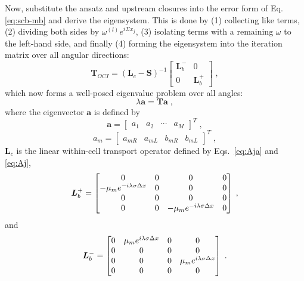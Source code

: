 Now, substitute the ansatz and upstream closures into the error form of Eq. \eqref{eq:scb-mb} and derive the eigensystem.
This is done by (1) collecting like terms, (2) dividing both sides by $\omega^{(l)} e^{i\Sigma x_j}$, (3) isolating terms with a remaining $\omega$ to the left-hand side, and finally (4) forming the eigensystem into the iteration matrix over all angular directions:
\begin{equation}
    \bm{T}_{OCI} = \left( 
    \bm{L}_c
    - \bm{S}
    \right)^{-1}
    \begin{bmatrix}
        \bm{L}_b^- & 0\\
        0 & \bm{L}_b^+
    \end{bmatrix} \;,
\end{equation}
which now forms a well-posed eigenvalue problem over all angles:
\begin{equation}
    \lambda\bm{a} = \bm{T} \bm{a} \; ,
\end{equation}
where the eigenvector $\mathbf{a}$ is defined by
\begin{equation}
    \mathbf{a} = \begin{bmatrix}
        a_{1} & a_{2} & \cdots & a_M
    \end{bmatrix} ^T \;,
\end{equation}
\begin{equation}
    a_m = \begin{bmatrix}
        a_{mR} & a_{mL} & b_{mR} & b_{mL} 
    \end{bmatrix} ^T \; ,
\end{equation}
$\bm{L}_c$ is the linear within-cell transport operator defined by Eqs.~\eqref{eq:Aja} and \eqref{eq:Aj}, 
\begin{equation}
    \bm{L}_b^+ = 
    \begin{bmatrix}
        0 & 0 & 0 & 0 \\
        -\mu_m e^{-i\lambda\sigma\Delta x} & 0 & 0 & 0 \\
        0 & 0 & 0 & 0 \\
        0 & 0 & -\mu_m e^{-i\lambda\sigma\Delta x} & 0
    \end{bmatrix} \; ,
\end{equation}
and
\begin{equation}
    \bm{L}_b^- = 
    \begin{bmatrix}
        0 & \mu_m e^{i\lambda\sigma\Delta x} & 0 & 0 \\
        0 & 0 & 0 & 0 \\
        0 & 0 & 0 & \mu_m e^{i\lambda\sigma\Delta x} \\
        0 & 0 & 0 & 0
    \end{bmatrix} \; .
\end{equation}
